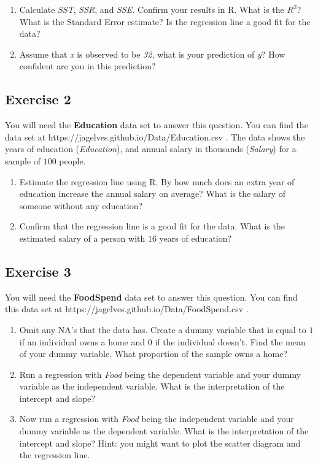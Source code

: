 \documentclass[
  letterpaper,
  DIV=11,
  numbers=noendperiod]{scrreprt}
\begin{document}
\begin{enumerate}
\def\labelenumi{\arabic{enumi}.}
\setcounter{enumi}{1}
\item
  Calculate \emph{SST}, \emph{SSR}, and \emph{SSE}. Confirm your results
  in R. What is the \(R^2\)? What is the Standard Error estimate? Is the
  regression line a good fit for the data?
\item
  Assume that \emph{x} is observed to be \emph{32}, what is your
  prediction of \emph{y}? How confident are you in this prediction?
\end{enumerate}

\hypertarget{exercise-2-12}{%
\subsection*{Exercise 2}\label{exercise-2-12}}

You will need the \textbf{Education} data set to answer this question.
You can find the data set at
https://jagelves.github.io/Data/Education.csv . The data shows the years
of education (\emph{Education}), and annual salary in thousands
(\emph{Salary}) for a sample of \(100\) people.

\begin{enumerate}
\def\labelenumi{\arabic{enumi}.}
\item
  Estimate the regression line using R. By how much does an extra year
  of education increase the annual salary on average? What is the salary
  of someone without any education?
\item
  Confirm that the regression line is a good fit for the data. What is
  the estimated salary of a person with \(16\) years of education?
\end{enumerate}

\hypertarget{exercise-3-12}{%
\subsection*{Exercise 3}\label{exercise-3-12}}

You will need the \textbf{FoodSpend} data set to answer this question.
You can find this data set at
https://jagelves.github.io/Data/FoodSpend.csv .

\begin{enumerate}
\def\labelenumi{\arabic{enumi}.}
\item
  Omit any NA's that the data has. Create a dummy variable that is equal
  to \(1\) if an individual owns a home and \(0\) if the individual
  doesn't. Find the mean of your dummy variable. What proportion of the
  sample owns a home?
\item
  Run a regression with \emph{Food} being the dependent variable and
  your dummy variable as the independent variable. What is the
  interpretation of the intercept and slope?
\item
  Now run a regression with \emph{Food} being the independent variable
  and your dummy variable as the dependent variable. What is the
  interpretation of the intercept and slope? Hint: you might want to
  plot the scatter diagram and the regression line.
\end{enumerate}
\end{document}
